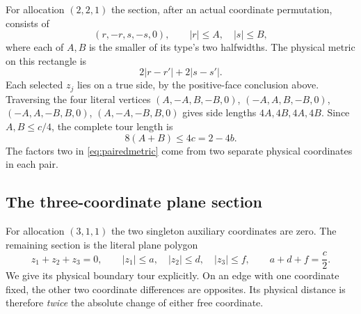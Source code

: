 \documentclass[11pt]{article}
\theoremstyle{definition}
\theoremstyle{remark}
\newcommand{\abs}[1]{\left|#1\right|}
\begin{document}
For allocation $(2,2,1)$ the section, after an actual coordinate
permutation, consists of
\[
 (r,-r,s,-s,0),\qquad \abs r\leq A,\quad\abs s\leq B,
\]
where each of $A,B$ is the smaller of its type's two halfwidths.
The physical metric on this rectangle is
\begin{equation}\label{eq:pairedmetric}
 2\abs{r-r'}+2\abs{s-s'}.
\end{equation}
Each selected $z_j$ lies on a true side, by the positive-face conclusion
above. Traversing the four literal vertices
$(A,-A,B,-B,0)$, $(-A,A,B,-B,0)$,
$(-A,A,-B,B,0)$, $(A,-A,-B,B,0)$ gives side lengths
$4A,4B,4A,4B$. Since $A,B\leq c/4$, the complete tour length is
\begin{equation}\label{eq:doubleperimeter}
 8(A+B)\leq4c=2-4b.
\end{equation}
The factors two in \eqref{eq:pairedmetric} come from two separate
physical coordinates in each pair.

\subsection{The three-coordinate plane section}

For allocation $(3,1,1)$ the two singleton auxiliary coordinates are
zero. The remaining section is the literal plane polygon
\begin{equation}\label{eq:planesection}
 z_1+z_2+z_3=0,\qquad
 \abs{z_1}\leq a,\quad\abs{z_2}\leq d,\quad\abs{z_3}\leq f,
 \qquad a+d+f=\frac c2.
\end{equation}
We give its physical boundary tour explicitly. On an edge with one
coordinate fixed, the other two coordinate differences are opposites.
Its physical distance is therefore \emph{twice} the absolute change
of either free coordinate.
\end{document}
